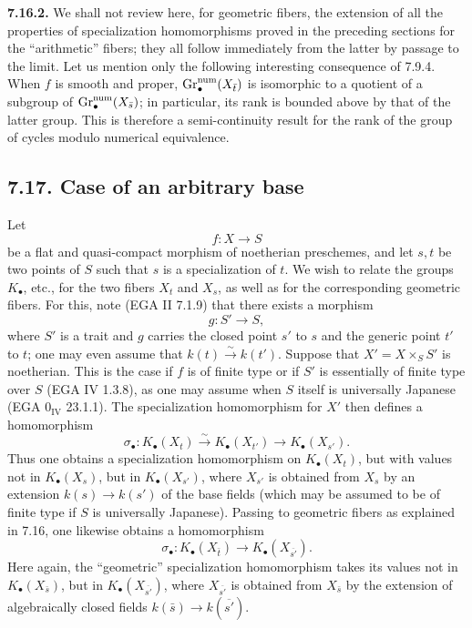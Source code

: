\textbf{7.16.2.}
We shall not review here, for geometric fibers, the extension of all the
properties of specialization homomorphisms proved in the preceding sections
for the ``arithmetic'' fibers; they all follow immediately from the latter
by passage to the limit. Let us mention only the following interesting
consequence of 7.9.4. When $f$ is smooth and proper,
$\operatorname{Gr}_\bullet^{\mathrm{num}}(X_{\bar t})$ is isomorphic to a quotient of a
subgroup of $\operatorname{Gr}_\bullet^{\mathrm{num}}(X_{\bar s})$; in particular, its
rank is bounded above by that of the latter group. This is therefore a
semi-continuity result for the rank of the group of cycles modulo numerical
equivalence.

\subsection*{7.17. Case of an arbitrary base}
Let
\[
f:X\longrightarrow S
\]
be a flat and quasi-compact morphism of noetherian preschemes, and let $s,t$
be two points of $S$ such that $s$ is a specialization of $t$. We wish to
relate the groups $K_\bullet$, etc., for the two fibers $X_t$ and $X_s$, as
well as for the corresponding geometric fibers. For this, note (EGA II
7.1.9) that there exists a morphism
\[
g:S'\longrightarrow S,
\]
where $S'$ is a trait and $g$ carries the closed point $s'$ to $s$ and the
generic point $t'$ to $t$; one may even assume that
$k(t)\xrightarrow{\sim}k(t')$. Suppose that $X'=X\times_SS'$ is
noetherian. This is the case if $f$ is of finite type or if $S'$ is
essentially of finite type over $S$ (EGA IV 1.3.8), as one may assume when
$S$ itself is universally Japanese (EGA $0_{\mathrm{IV}}$ 23.1.1). The
specialization homomorphism for $X'$ then defines a homomorphism
\begin{equation}\tag{7.17.1}
\sigma_\bullet:K_\bullet(X_t)\xrightarrow{\sim}K_\bullet(X_{t'})
  \longrightarrow K_\bullet(X_{s'}).
\end{equation}
Thus one obtains a specialization homomorphism on $K_\bullet(X_t)$, but with
values not in $K_\bullet(X_s)$, but in $K_\bullet(X_{s'})$, where $X_{s'}$
is obtained from $X_s$ by an extension $k(s)\to k(s')$ of the base fields
(which may be assumed to be of finite type if $S$ is universally Japanese).
Passing to geometric fibers as explained in 7.16, one likewise obtains a
homomorphism
\begin{equation}\tag{7.17.2}
\sigma_\bullet:K_\bullet(X_{\bar t})
  \longrightarrow K_\bullet(X_{\overline{s'}}).
\end{equation}
Here again, the ``geometric'' specialization homomorphism takes its values
not in $K_\bullet(X_{\bar s})$, but in
$K_\bullet(X_{\overline{s'}})$, where $X_{\overline{s'}}$ is obtained from
$X_{\bar s}$ by the extension of algebraically closed fields
$k(\bar s)\to k(\overline{s'})$.

